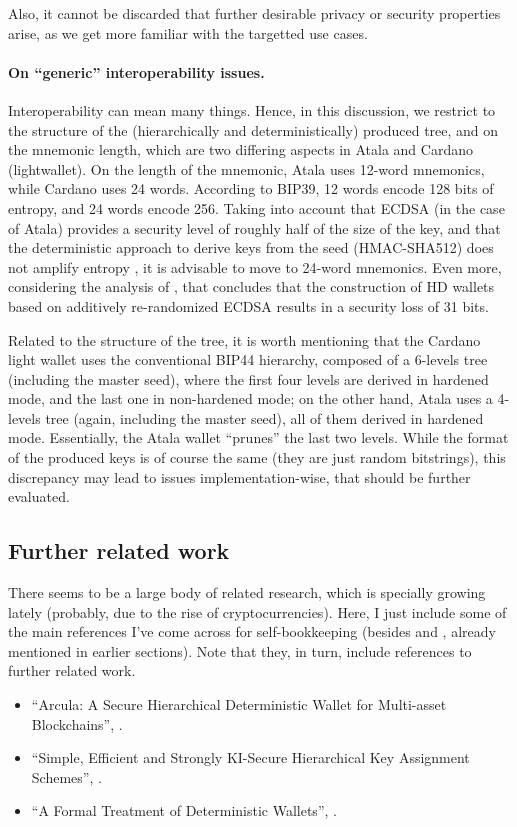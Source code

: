 Also, it cannot be discarded that further desirable privacy or security
properties arise, as we get more familiar with the targetted use cases.

\paragraph{On ``generic'' interoperability issues.} %
Interoperability can mean many things. Hence, in this discussion, we restrict
to the structure of the (hierarchically and deterministically) produced tree,
and on the mnemonic length, which are two differing aspects in Atala and
Cardano (lightwallet). On the length of the mnemonic, Atala uses 12-word
mnemonics, while Cardano uses 24 words. According to BIP39, 12 words encode
128 bits of entropy, and 24 words encode 256. Taking into account that ECDSA
(in the case of Atala) provides a security level of roughly half of the size
of the key, and that the deterministic approach to derive keys from the seed
(HMAC-SHA512) does not amplify entropy \cite{rfc5869}, it is advisable to move
to 24-word mnemonics. Even more, considering the analysis of \cite{def+21},
that concludes that the construction of HD wallets based on additively
re-randomized ECDSA results in a security loss of 31 bits.

Related to the structure of the tree, it is worth mentioning that the Cardano
light wallet uses the conventional BIP44 hierarchy, composed of a 6-levels tree
(including the master seed), where the first four levels are derived in
hardened mode, and the last one in non-hardened mode; on the other hand, Atala
uses a 4-levels tree (again, including the master seed), all of them derived
in hardened mode. Essentially, the Atala wallet ``prunes'' the last two levels.
While the format of the produced keys is of course the same (they are just
random bitstrings), this discrepancy may lead to issues implementation-wise,
that should be further evaluated.
  
\subsection{Further related work}

There seems to be a large body of related research, which is specially
growing lately (probably, due to the rise of cryptocurrencies). Here,
I just include some of the main references I've come across for
self-bookkeeping (besides \cite{kkl20} and \cite{def+21}, already
mentioned in earlier sections). Note that they, in turn, include references
to further related work.

\begin{itemize}
\item ``Arcula: A Secure Hierarchical Deterministic Wallet for Multi-asset
  Blockchains'', \cite{lfa20}.
\item ``Simple, Efficient and Strongly KI-Secure Hierarchical Key Assignment
  Schemes'', \cite{fpp13}.
\item ``A Formal Treatment of Deterministic Wallets'', \cite{dfl19}.
\end{itemize}

